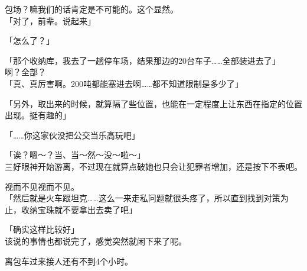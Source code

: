 包场？嘛我们的话肯定是不可能的。这个显然。\\

「对了，前辈。说起来」

「怎么了？」

「那个收纳库，我去了一趟停车场，结果那边的20台车子……全部装进去了」\\

啊？全部？\\

「真、真厉害啊。200吨都能塞进去啊……都不知道限制是多少了」

「另外，取出来的时候，就算隔了些位置，也能在一定程度上让东西在指定的位置出现。挺有趣的」

「……你这家伙没把公交当乐高玩吧」

「诶？嗯～？当、当～然～没～啦～」\\

三好眼神开始游离，不过现在就算点破她也只会让犯罪者增加，还是按下不表吧。

视而不见视而不见。\\

「然后就是火车跟坦克……这么一来走私问题就很头疼了，所以直到找到对策为止，收纳宝珠就不要拿出去卖了吧」

「确实这样比较好」\\

该说的事情也都说完了，感觉突然就闲下来了呢。

离包车过来接人还有不到4个小时。\\

